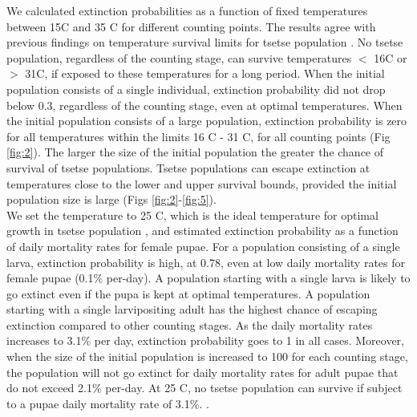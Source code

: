 We calculated extinction probabilities as a function of fixed temperatures between 15\degree C and 35 \degree C for different counting points. The results agree with previous findings on temperature survival limits for tsetse population \cite{Edney1962,Kleynhans2011e,Pagabeleguem2016f,Are2019}. No tsetse population, regardless of the counting stage, can survive temperatures $<$ 16\degree C or $>$ 31\degree C, if exposed to these temperatures for a long period. When the initial population consists of a single individual, extinction probability did not drop below 0.3, regardless of the counting stage, even at optimal temperatures. When the initial population consists of a large population, extinction probability is zero for all temperatures within the limits 16 \degree C - 31 \degree  C, for all counting points (Fig \ref{fig:2}). The larger the size of the initial population the greater the chance of survival of tsetse populations. Tsetse populations can escape extinction at temperatures close to the lower and upper survival bounds, provided the initial population size is large (Figs \ref{fig:2}-\ref{fig:5}).\\


We set the temperature to 25 \degree C, which is the ideal temperature for optimal growth in tsetse population
\cite{Pagabeleguem2016f,Are2019}, and estimated extinction probability as a function of daily mortality rates for female pupae. For a population consisting of a single larva, extinction probability is high, at 0.78, even at low daily mortality rates for female pupae (0.1\% per-day). A population starting with a single larva is likely to go extinct even if the pupa is kept at optimal temperatures. A population starting with a single larvipositing adult has the highest chance of escaping extinction compared to other counting stages. As the daily mortality rates increases to 3.1\% per day, extinction probability goes to 1 in all cases. Moreover, when the size of the initial population is increased to 100 for each counting stage, the population will not go extinct for daily mortality rates for adult pupae that do not exceed 2.1\% per-day. At 25 \degree C, no tsetse population can survive if subject to a pupae daily mortality rate of 3.1\%. \cite{Hargrove2019a}. \\ 



